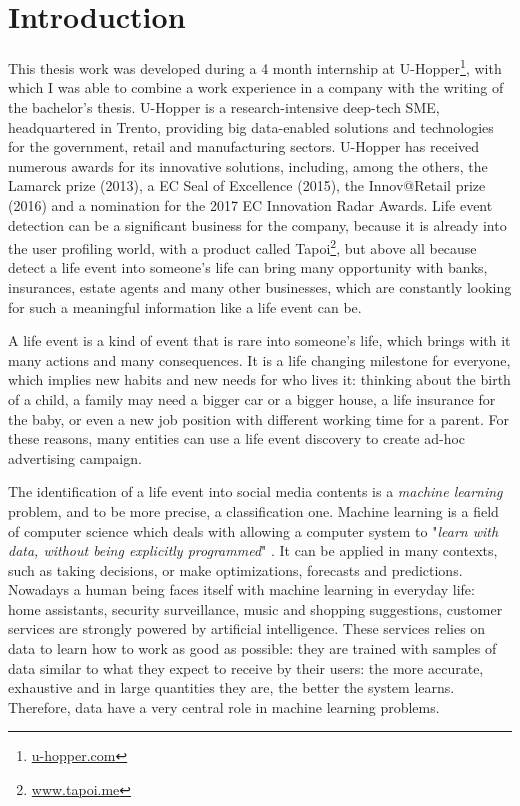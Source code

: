 \chapter{Introduction}
\label{cha:intro}

This thesis work was developed during a 4 month internship at U-Hopper\footnote{\url{u-hopper.com}}, with which I was able to combine a work experience in a company with the writing of the bachelor's thesis. U-Hopper is a research-intensive deep-tech SME, headquartered in Trento, providing big data-enabled solutions and technologies for the government, retail and manufacturing sectors. U-Hopper has received numerous awards for its innovative solutions, including, among the others, the Lamarck prize (2013), a EC Seal of Excellence (2015), the Innov@Retail prize (2016) and a nomination for the 2017 EC Innovation Radar Awards. Life event detection can be a significant business for the company, because it is already into the user profiling world, with a product called Tapoi\footnote{\url{www.tapoi.me}}, but above all because detect a life event into someone's life can bring many opportunity with banks, insurances, estate agents and many other businesses, which are constantly looking for such a meaningful information like a life event can be.

A life event is a kind of event that is rare into someone's life, which brings with it many actions and many consequences. It is a life changing milestone for everyone, which implies new habits and new needs for who lives it: thinking about the birth of a child, a family may need a bigger car or a bigger house, a life insurance for the baby, or even a new job position with different working time for a parent. For these reasons, many entities can use a life event discovery to create ad-hoc advertising campaign. 

The identification of a life event into social media contents is a \emph{machine learning} problem, and to be more precise, a classification one. Machine learning is a field of computer science which deals with allowing a computer system to "\textit{learn with data, without being explicitly programmed}" \cite{samuel1959some}. It can be applied in many contexts, such as taking decisions, or make optimizations, forecasts and predictions. Nowadays a human being faces itself with machine learning in everyday life: home assistants, security surveillance, music and shopping suggestions, customer services are strongly powered by artificial intelligence. These services relies on data to learn how to work as good as possible: they are trained with samples of data similar to what they expect to receive by their users: the more accurate, exhaustive and in large quantities they are, the better the system learns. Therefore, data have a very central role in machine learning problems.

